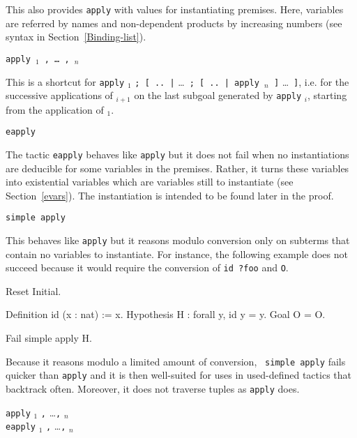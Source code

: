 \begin{coq_example*}
\begin{Variants}
  This also provides {\tt apply} with values for instantiating
  premises. Here, variables are referred by names and non-dependent
  products by increasing numbers (see syntax in Section~\ref{Binding-list}).

\item {\tt apply \term$_1$ , \mbox{\dots} , \term$_n$}

  This is a shortcut for {\tt apply} {\term$_1$} {\tt ; [ ..~|}
   \ldots~{\tt ; [ ..~| {\tt apply} {\term$_n$} ]} \ldots~{\tt ]}, i.e. for the
   successive applications of {\term$_{i+1}$} on the last subgoal
   generated by {\tt apply} {\term$_i$}, starting from the application
   of {\term$_1$}.

\item {\tt eapply \term}

  The tactic {\tt eapply} behaves like {\tt apply} but it does not fail
  when no instantiations are deducible for some variables in the
  premises. Rather, it turns these variables into 
  existential variables which are variables still to instantiate (see
  Section~\ref{evars}). The instantiation is intended to be found
  later in the proof.

\item {\tt simple apply {\term}} 

  This behaves like {\tt apply} but it reasons modulo conversion only
  on subterms that contain no variables to instantiate. For instance,
  the following example does not succeed because it would require the
  conversion of {\tt id ?foo} and {\tt O}.

\begin{coq_eval}
Reset Initial.
\end{coq_eval}
\begin{coq_example*}
Definition id (x : nat) := x.
Hypothesis H : forall y, id y = y.
Goal O = O.
\end{coq_example*}
\begin{coq_example}
Fail simple apply H.
\end{coq_example}

  Because it reasons modulo a limited amount of conversion, {\tt
  simple apply} fails quicker than {\tt apply} and it is then
  well-suited for uses in used-defined tactics that backtrack often.
  Moreover, it does not traverse tuples as {\tt apply} does.

\item {} {\tt apply} {\term$_1$}  {\tt ,} \ldots {\tt ,} {\term$_n$} \\
   {\tt eapply} {\term$_1$}  {\tt ,} \ldots {\tt ,} {\term$_n$} 


\end{Variants}
\end{coq_example*}
